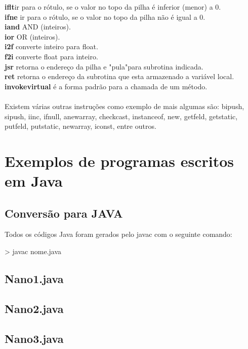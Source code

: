 \documentclass[12pt,a4paper,twoside]{report}
\begin{document}
 \textbf{iflt}ir para o rótulo, se o valor no topo da pilha é inferior (menor) a 0.\\
 \textbf{ifne} ir para o rótulo, se o valor no topo da pilha não é igual a 0.\\
 \textbf{iand} AND (inteiros).\\
 \textbf{ior } OR (inteiros).\\
 \textbf{ i2f} converte inteiro para float.\\
 \textbf{ f2i} converte float para inteiro.\\
 \textbf{ jsr} retorna o endereço da pilha e "pula"para subrotina indicada.\\
 \textbf{ ret} retorna o endereço da subrotina que esta armazenado a variável local.\\
 \textbf{ invokevirtual} é a forma padrão para a chamada de um método.\\ \\
Existem várias outras instruções como exemplo de mais algumas são: bipush, sipush, iinc, ifnull,
anewarray, checkcast, instanceof, new, getfeld, getstatic, putfeld, putstatic, newarray, iconst, entre outros.\\

\chapter{Exemplos de programas escritos em Java \label{ap:Testes}}
\section{Conversão para JAVA}
Todos os códigos Java foram gerados pelo javac com o seguinte  comando: 
\begin{terminal}
> javac nome.java
\end{terminal}


\section{Nano1.java}

\section{Nano2.java}

\section{Nano3.java}

\end{document}
